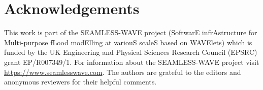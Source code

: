 \section*{Acknowledgements}

This work is part of the SEAMLESS-WAVE project (SoftwarE infrAstructure for Multi-purpose fLood modElling at variouS scaleS based on WAVElets) which is funded by the UK Engineering and Physical Sciences Research Council (EPSRC) grant EP/R007349/1.
For information about the SEAMLESS-WAVE project visit \url{https://www.seamlesswave.com}.
The authors are grateful to the editors and anonymous reviewers for their helpful comments.